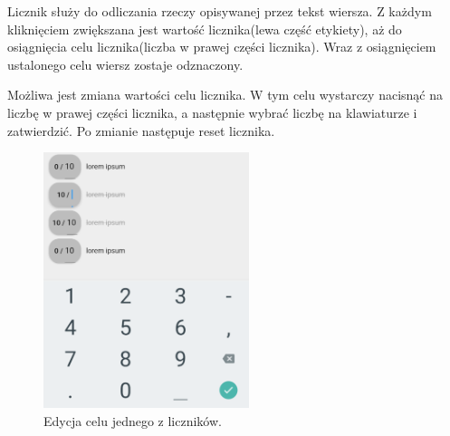 Licznik służy do odliczania rzeczy opisywanej przez tekst wiersza. Z każdym kliknięciem zwiększana jest wartość licznika(lewa część etykiety), aż do osiągnięcia celu licznika(liczba w prawej części licznika). Wraz z osiągnięciem ustalonego celu wiersz zostaje odznaczony.

Możliwa jest zmiana wartości celu licznika. W tym celu wystarczy nacisnąć na liczbę w prawej części licznika, a następnie wybrać liczbę na klawiaturze i zatwierdzić. Po zmianie następuje reset licznika.


\begin{figure}[ht]
    \centering
    \includegraphics[width=6cm]{images/liczniki.png}
    \caption{Edycja celu jednego z liczników.}
    \vspace{3mm}
\end{figure}